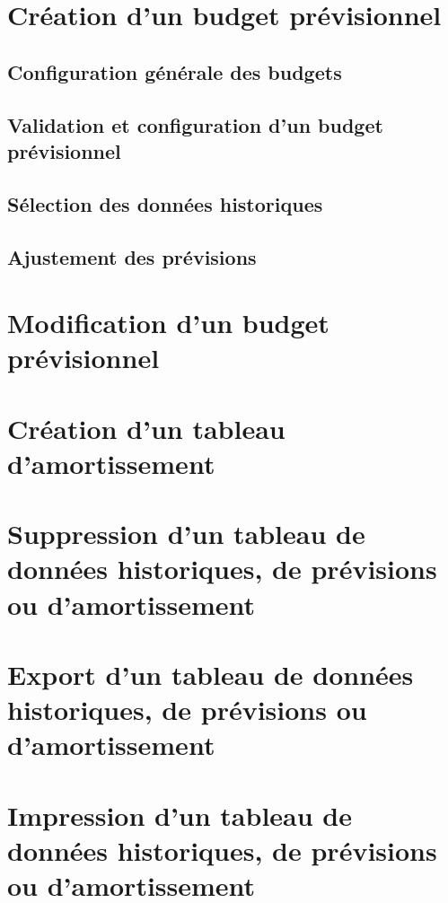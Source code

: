 \section{Création d'un budget prévisionnel\label{budget-create}}


\subsection{Configuration générale des budgets\label{budget-create-general}}


\subsection{Validation et configuration d'un budget prévisionnel\label{budget-create-configure}}


\subsection{Sélection des données historiques\label{budget-create-selection}}



\subsection{Ajustement des prévisions\label{budget-create-adjust}}


\section{Modification d'un budget prévisionnel\label{budget-modify}}


\section{Création d'un tableau d'amortissement\label{budget-amortizationCreate}}


\section{Suppression d'un tableau de données historiques, de prévisions ou d'amortissement\label{budget-remove}}


\section{Export d'un tableau de données historiques, de prévisions ou d'amortissement\label{budget-export}}


\section{Impression d'un tableau de données historiques, de prévisions ou d'amortissement\label{budget-print}}



